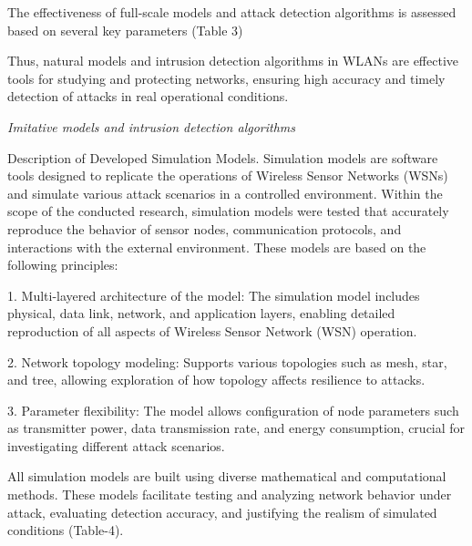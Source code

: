 \begin{multicols}{2}

The effectiveness of full-scale models and attack detection algorithms is assessed based on several key parameters (Table 3) 

Thus, natural models and intrusion detection algorithms in WLANs are
effective tools for studying and protecting networks, ensuring high
accuracy and timely detection of attacks in real operational conditions.

\emph{Imitative models and intrusion detection algorithms}

Description of Developed Simulation Models. Simulation models are
software tools designed to replicate the operations of Wireless Sensor
Networks (WSNs) and simulate various attack scenarios in a controlled
environment. Within the scope of the conducted research, simulation
models were tested that accurately reproduce the behavior of sensor
nodes, communication protocols, and interactions with the external
environment. These models are based on the following principles:

1. Multi-layered architecture of the model: The simulation model
includes physical, data link, network, and application layers, enabling
detailed reproduction of all aspects of Wireless Sensor Network (WSN)
operation.

2. Network topology modeling: Supports various topologies such as mesh,
star, and tree, allowing exploration of how topology affects resilience
to attacks.

3. Parameter flexibility: The model allows configuration of node
parameters such as transmitter power, data transmission rate, and energy
consumption, crucial for investigating different attack scenarios.

All simulation models are built using diverse mathematical and
computational methods. These models facilitate testing and analyzing
network behavior under attack, evaluating detection accuracy, and
justifying the realism of simulated conditions (Table-4).
\end{multicols}





